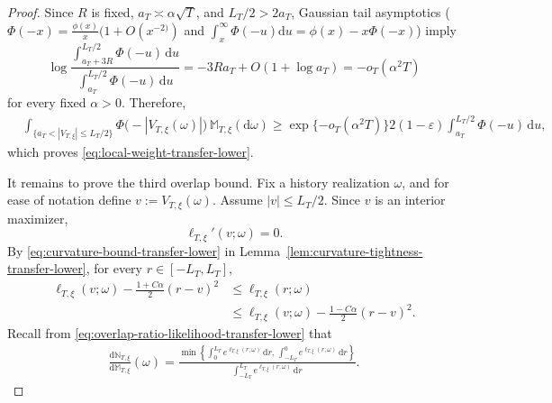 \documentclass[10pt]{article}
\newcommand{\dd}{\mathrm{d}}
\theoremstyle{plain}
\begin{document}
\begin{proof}
Since \(R\) is fixed, \(a_T\asymp\alpha\sqrt T\), and
\(L_T/2>2a_T\), Gaussian tail asymptotics ($\Phi(-x)=\frac{\phi(x)}{x}(1+O(x^{-2)})$ and $\int^\infty_x \Phi(-u) \dd u=\phi(x)-x\Phi(-x)$) imply
\[
    \log
    \frac{
        \displaystyle
        \int_{a_T+3R}^{L_T/2}
            \Phi(-u)\,\dd u
    }{
        \displaystyle
        \int_{a_T}^{L_T/2}
            \Phi(-u)\,\dd u
    }
    =
    -3Ra_T+O(1+\log a_T)
    =
    -o_T(\alpha^2T)
\]
for every fixed \(\alpha>0\). Therefore,
\[
\begin{aligned}
    &\int_{\{a_T<|V_{T,\xi}|\le L_T/2\}}
        \Phi\bigl(-|V_{T,\xi}(\omega)|\bigr)
    \,\mathbb M_{T,\xi}(\dd\omega)
    \ge
    \exp\{-o_T(\alpha^2T)\}
    2(1-\varepsilon)
    \int_{a_T}^{L_T/2}
        \Phi(-u)
    \,\dd u,
\end{aligned}
\]
which proves \eqref{eq:local-weight-transfer-lower}.


It remains to prove the third overlap bound. Fix a history realization $\omega$, and for ease of notation define $v:=V_{T,\xi}(\omega)$. Assume $|v|\le L_T/2$.
Since $v$ is an interior maximizer,
\[
    \ell_{T,\xi}'(v;\omega)=0.
\]
By \eqref{eq:curvature-bound-transfer-lower} in
Lemma~\ref{lem:curvature-tightness-transfer-lower}, for every
$r\in[-L_T,L_T]$,
\begin{equation}
\label{eq:quadratic-likelihood-comparison-transfer-lower}
\begin{aligned}
    \ell_{T,\xi}(v;\omega)
    -
    \frac{1+C\alpha}{2}(r-v)^2
    &\le
    \ell_{T,\xi}(r;\omega)\\
    &\le
    \ell_{T,\xi}(v;\omega)
    -
    \frac{1-C\alpha}{2}(r-v)^2.
\end{aligned}
\end{equation}
Recall from \eqref{eq:overlap-ratio-likelihood-transfer-lower} that
\[
\begin{aligned}
    \frac{\dd\mathbb N_{T,\xi}}
         {\dd\mathbb M_{T,\xi}}(\omega)
    =
    \frac{
        \min\left\{
            \displaystyle
            \int_0^{L_T}
                e^{\ell_{T,\xi}(r;\omega)}
            \,\dd r,\,
            \displaystyle
            \int_{-L_T}^{0}
                e^{\ell_{T,\xi}(r;\omega)}
            \,\dd r
        \right\}
    }{
        \displaystyle
        \int_{-L_T}^{L_T}
            e^{\ell_{T,\xi}(r;\omega)}
        \,\dd r
    }.
\end{aligned}
\]


\end{proof}
\end{document}
